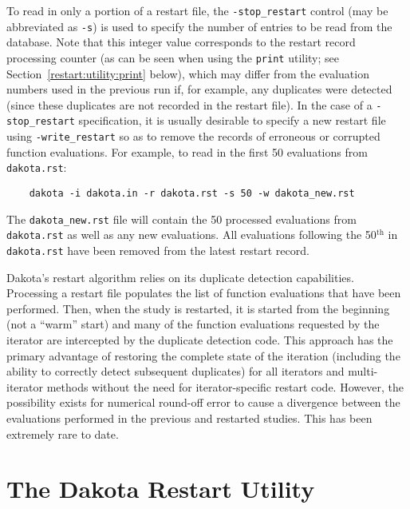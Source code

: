 To read in only a portion of a restart file, the
\texttt{-stop\_restart} control (may be abbreviated as \texttt{-s}) is
used to specify the number of entries to be read from the
database. Note that this integer value corresponds to the restart
record processing counter (as can be seen when using the
\texttt{print} utility; see Section~\ref{restart:utility:print} below),
which may differ from the evaluation numbers used in the previous run
if, for example, any duplicates were detected (since these duplicates
are not recorded in the restart file).  In the case of a
\texttt{-stop\_restart} specification, it is usually desirable to
specify a new restart file using \texttt{-write\_restart} so as to
remove the records of erroneous or corrupted function evaluations. For
example, to read in the first 50 evaluations from
\texttt{dakota.rst}:
\begin{small}
\begin{verbatim}
    dakota -i dakota.in -r dakota.rst -s 50 -w dakota_new.rst
\end{verbatim}
\end{small}

The \texttt{dakota\_new.rst} file will contain the 50 processed
evaluations from \texttt{dakota.rst} as well as any new evaluations.
All evaluations following the 50$^{\mathrm{th}}$ in \texttt{dakota.rst}
have been removed from the latest restart record.

Dakota's restart algorithm relies on its duplicate detection
capabilities. Processing a restart file populates the list of function
evaluations that have been performed. Then, when the study is
restarted, it is started from the beginning (not a ``warm'' start) and
many of the function evaluations requested by the iterator are
intercepted by the duplicate detection code. This approach has the
primary advantage of restoring the complete state of the iteration
(including the ability to correctly detect subsequent duplicates) for
all iterators and multi-iterator methods without the need for
iterator-specific restart code. However, the possibility exists for
numerical round-off error to cause a divergence between the
evaluations performed in the previous and restarted studies. This has
been extremely rare to date.

\section{The Dakota Restart Utility}\label{restart:utility}

